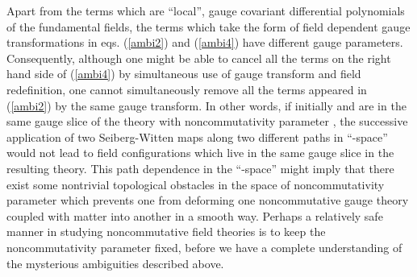 \documentclass[a4paper,a4paper]{article}%
\begin{document}
Apart from the terms which are ``local'', gauge covariant differential
polynomials of the fundamental fields, the terms which take the form of field
dependent gauge transformations in eqs. (\ref{ambi2}) and (\ref{ambi4}) have
different gauge parameters. Consequently, although one might be able to cancel
all the terms on the right hand side of (\ref{ambi4}) by simultaneous use of
gauge transform and field redefinition, one cannot simultaneously remove all
the terms appeared in (\ref{ambi2}) by the same gauge transform. In other
words, if initially \coordHE{} and \myHighlight{$\hat{\psi}$}\coordHE{} are in the same gauge slice
of the theory with noncommutativity parameter \myHighlight{$\theta$}\coordHE{}, the successive
application of two Seiberg-Witten maps along two different paths in ``\myHighlight{$\theta
$}\coordHE{}-space'' would not lead to field configurations which live in the same gauge
slice in the resulting theory. This path dependence in the ``\myHighlight{$\theta$}\coordHE{}-space''
might imply that there exist some nontrivial topological obstacles in the
space of noncommutativity parameter which prevents one from deforming one
noncommutative gauge theory coupled with matter into another in a smooth way.
Perhaps a relatively safe manner in studying noncommutative field theories is
to keep the noncommutativity parameter fixed, before we have a complete
understanding of the mysterious ambiguities described above.

\bigskip

\bigskip
\end{document}
